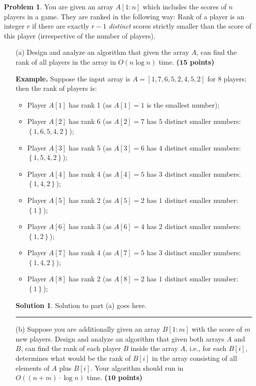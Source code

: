 \documentclass{article}
\theoremstyle{definition}
\newtheorem{problem}{Problem}
\def\fline{\rule{0.75\linewidth}{0.5pt}}
\newcommand{\finishline}{\begin{center}\fline\end{center}}
\newtheorem*{solution*}{Solution}
\newenvironment{solution}{\begin{solution*}}{{\finishline} \end{solution*}}
\newcommand{\grade}[1]{\hfill{\textbf{($\mathbf{#1}$ points)}}}
\newcommand{\set}[1]{\ensuremath{\left\{ #1 \right\}}}
\begin{document}
\begin{problem}
    You are given an array $A[1:n]$ which includes the scores of $n$ players in a game. They are ranked in the following way: 
    Rank of a player is an integer $r$ if there are exactly $r-1$ \emph{distinct} scores strictly smaller than the score of this player (irrespective of the number of players).
  
  \begin{enumerate}
  	\item[(a)] Design and analyze an algorithm that given the array $A$, can find the rank of all players in the array in $O(n\log{n})$ time. \grade{15}
    
    	\medskip
    
    \textbf{Example.} Suppose the input array is $A=[1,7,6,5,2,4,5,2]$ for 8 players; then the rank of  players is: 
    \begin{itemize}
        \item Player $A[1]$ has rank 1 (as $A[1]=1$ is the smallest number); 
        \item Player $A[2]$ has rank 6 (as $A[2]=7$ has $5$ distinct smaller numbers: $\set{1,6,5,4,2}$);
        \item Player $A[3]$ has rank 5 (as $A[3]=6$ has $4$ distinct smaller numbers: $\set{1,5,4,2}$);
        \item Player $A[4]$ has rank 4 (as $A[4]=5$ has $3$ distinct smaller numbers: $\set{1,4,2}$);
        \item Player $A[5]$ has rank 2 (as $A[5]=2$ has $1$ distinct smaller number: $\set{1}$);
        \item Player $A[6]$ has rank 3 (as $A[6]=4$ has $2$ distinct smaller numbers: $\set{1,2}$);
        \item Player $A[7]$ has rank 4 (as $A[7]=5$ has $3$ distinct smaller numbers: $\set{1,4,2}$);
        \item Player $A[8]$ has rank 2 (as $A[8]=2$ has $1$ distinct smaller number: $\set{1}$);
    \end{itemize}
    
    
    		    \begin{solution}
	Solution to part (a) goes here. %
\end{solution}

    \item [(b)] Suppose you are additionally given an array $B[1:m]$ with the score of $m$ new players. Design and analyze an algorithm that given both arrays $A$ and $B$, can find the rank of each player $B$ inside the array $A$, i.e., 
    for each $B[i]$, determines what would be  the rank of $B[i]$ in the array consisting of all elements of $A$ plus $B[i]$. Your algorithm should run in $O((n+m) \cdot \log{n})$ time. \grade{10} 
      

\end{enumerate}
\end{problem}
\end{document}

